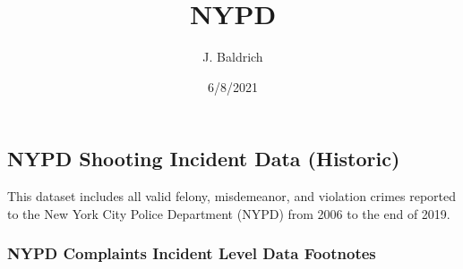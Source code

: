 \documentclass[
]{article}
\title{NYPD}
\author{J. Baldrich}
\date{6/8/2021}
\begin{document}
\maketitle

\hypertarget{nypd-shooting-incident-data-historic}{%
\subsection{NYPD Shooting Incident Data
(Historic)}\label{nypd-shooting-incident-data-historic}}

This dataset includes all valid felony, misdemeanor, and violation
crimes reported to the New York City Police Department (NYPD) from 2006
to the end of 2019.

\hypertarget{nypd-complaints-incident-level-data-footnotes}{%
\subsubsection{NYPD Complaints Incident Level Data
Footnotes}\label{nypd-complaints-incident-level-data-footnotes}}
\end{document}
